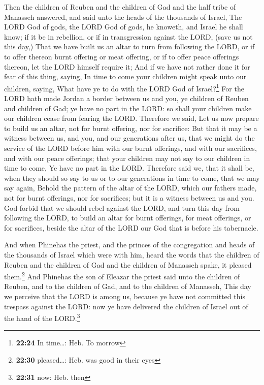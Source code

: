  Then the children of Reuben and the children of Gad and
the half tribe of Manasseh answered, and said unto the heads of the
thousands of Israel,  The LORD God of gods, the LORD God
of gods, he knoweth, and Israel he shall know; if it be in rebellion, or
if in transgression against the LORD, (save us not this day,)
 That we have built us an altar to turn from following
the LORD, or if to offer thereon burnt offering or meat offering, or if
to offer peace offerings thereon, let the LORD himself require it;
 And if we have not rather done it for fear of this
thing, saying, In time to come your children might speak unto our
children, saying, What have ye to do with the LORD God of
Israel?\footnote{\textbf{22:24} In time\ldots: Heb. To morrow}
 For the LORD hath made Jordan a border between us and
you, ye children of Reuben and children of Gad; ye have no part in the
LORD: so shall your children make our children cease from fearing the
LORD.  Therefore we said, Let us now prepare to build us
an altar, not for burnt offering, nor for sacrifice:  But
that it may be a witness between us, and you, and our generations after
us, that we might do the service of the LORD before him with our burnt
offerings, and with our sacrifices, and with our peace offerings; that
your children may not say to our children in time to come, Ye have no
part in the LORD.  Therefore said we, that it shall be,
when they should so say to us or to our generations in time to come,
that we may say again, Behold the pattern of the altar of the LORD,
which our fathers made, not for burnt offerings, nor for sacrifices; but
it is a witness between us and you.  God forbid that we
should rebel against the LORD, and turn this day from following the
LORD, to build an altar for burnt offerings, for meat offerings, or for
sacrifices, beside the altar of the LORD our God that is before his
tabernacle.

 And when Phinehas the priest, and the princes of the
congregation and heads of the thousands of Israel which were with him,
heard the words that the children of Reuben and the children of Gad and
the children of Manasseh spake, it pleased them.\footnote{\textbf{22:30}
  pleased\ldots: Heb. was good in their eyes}  And
Phinehas the son of Eleazar the priest said unto the children of Reuben,
and to the children of Gad, and to the children of Manasseh, This day we
perceive that the LORD is among us, because ye have not committed this
trespass against the LORD: now ye have delivered the children of Israel
out of the hand of the LORD.\footnote{\textbf{22:31} now: Heb. then}

